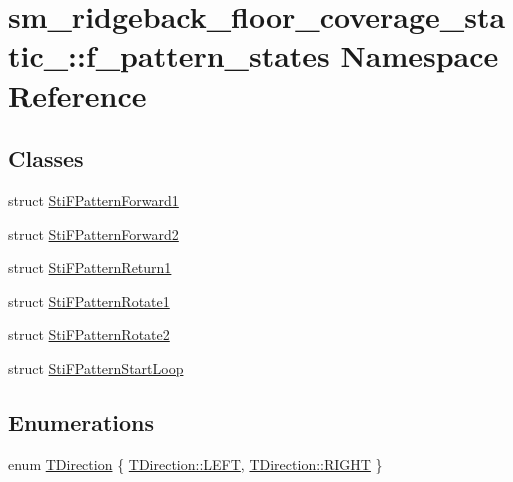 \hypertarget{namespacesm__ridgeback__floor__coverage__static__1_1_1f__pattern__states}{}\section{sm\+\_\+ridgeback\+\_\+floor\+\_\+coverage\+\_\+static\+\_\+:\+:f\+\_\+pattern\+\_\+states Namespace Reference}
\label{namespacesm__ridgeback__floor__coverage__static__1_1_1f__pattern__states}
\subsection*{Classes}
\begin{DoxyCompactItemize}
\item 
struct \hyperlink{classsm__ridgeback__floor__coverage__static__1_1_1f__pattern__states_1_1StiFPatternForward1}{Sti\+F\+Pattern\+Forward1}
\item 
struct \hyperlink{classsm__ridgeback__floor__coverage__static__1_1_1f__pattern__states_1_1StiFPatternForward2}{Sti\+F\+Pattern\+Forward2}
\item 
struct \hyperlink{classsm__ridgeback__floor__coverage__static__1_1_1f__pattern__states_1_1StiFPatternReturn1}{Sti\+F\+Pattern\+Return1}
\item 
struct \hyperlink{classsm__ridgeback__floor__coverage__static__1_1_1f__pattern__states_1_1StiFPatternRotate1}{Sti\+F\+Pattern\+Rotate1}
\item 
struct \hyperlink{classsm__ridgeback__floor__coverage__static__1_1_1f__pattern__states_1_1StiFPatternRotate2}{Sti\+F\+Pattern\+Rotate2}
\item 
struct \hyperlink{classsm__ridgeback__floor__coverage__static__1_1_1f__pattern__states_1_1StiFPatternStartLoop}{Sti\+F\+Pattern\+Start\+Loop}
\end{DoxyCompactItemize}
\subsection*{Enumerations}
\begin{DoxyCompactItemize}
\item 
enum \hyperlink{namespacesm__ridgeback__floor__coverage__static__1_1_1f__pattern__states_ad85e4f6b7cecf87bbe0eef96a899de72}{T\+Direction} \{ \hyperlink{namespacesm__ridgeback__floor__coverage__static__1_1_1f__pattern__states_ad85e4f6b7cecf87bbe0eef96a899de72a684d325a7303f52e64011467ff5c5758}{T\+Direction\+::\+L\+E\+FT}, 
\hyperlink{namespacesm__ridgeback__floor__coverage__static__1_1_1f__pattern__states_ad85e4f6b7cecf87bbe0eef96a899de72a21507b40c80068eda19865706fdc2403}{T\+Direction\+::\+R\+I\+G\+HT}
 \}
\end{DoxyCompactItemize}


